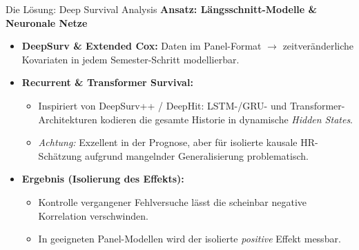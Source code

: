\documentclass[12pt]{beamer}
\begin{document}
\begin{frame}{Die Lösung: Deep Survival Analysis}
    \footnotesize
    \textbf{Ansatz: Längsschnitt-Modelle \& Neuronale Netze}
    \vspace{0.05cm}
    
    \begin{itemize}
        \item \textbf{DeepSurv \& Extended Cox:} Daten im Panel-Format $\rightarrow$ zeitveränderliche Kovariaten in jedem Semester-Schritt modellierbar.
        \vspace{0.05cm}
        \item \textbf{Recurrent \& Transformer Survival:}
        \begin{itemize}
            \item Inspiriert von DeepSurv++ / DeepHit: LSTM-/GRU- und Transformer-Architekturen kodieren die gesamte Historie in dynamische \textit{Hidden States}.
            \item \textit{Achtung:} Exzellent in der Prognose, aber für isolierte kausale HR-Schätzung aufgrund mangelnder Generalisierung problematisch.
        \end{itemize}
        \vspace{0.05cm}
        \item \textbf{Ergebnis (Isolierung des Effekts):} 
        \begin{itemize}
            \item Kontrolle vergangener Fehlversuche lässt die scheinbar negative Korrelation verschwinden.
            \item In geeigneten Panel-Modellen wird der isolierte \textit{positive} Effekt messbar.
        \end{itemize}
    \end{itemize}
\end{frame}
\end{document}
